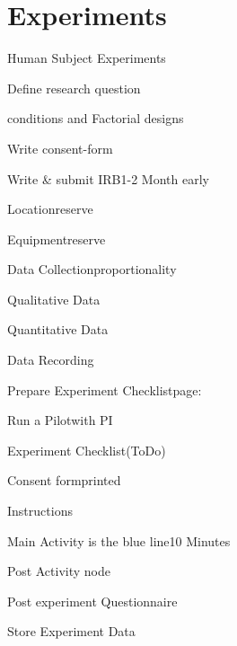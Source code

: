 
\section{Experiments}
\begin{checklist}{Human Subject Experiments}
    \item{Define research question}{}
    \item{conditions and Factorial designs }{\cite{FactorialTB,FactorialWiki}}
        \item{Write consent-form}{}
    \item{Write \& submit IRB}{1-2 Month early}
    \item{Location}{reserve}
    \item{Equipment}{reserve}
    \item{Data Collection}{proportionality}
    \item{Qualitative Data}{}
    \item{Quantitative Data}{}
    \item{Data Recording}{}
    \item{Prepare Experiment Checklist}{page:~\pageref{TAB:EXPR}} %
    \item{Run a Pilot}{with PI}
\end{checklist}


\begin{checklist}{Experiment Checklist(ToDo)}\label{TAB:EXPR} 
  \item{Consent form}{printed}
  \item{Instructions}{}
  \item{Main Activity is the blue line}{10 Minutes}
  \item{Post Activity node}{}
  \item{Post experiment Questionnaire}{}
  \item{Store Experiment Data}{}
\end{checklist}